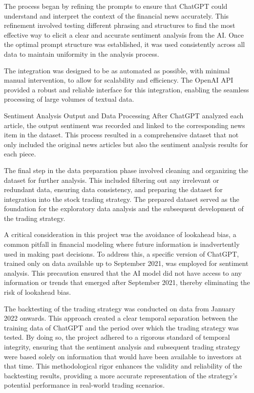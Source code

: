 The process began by refining the prompts to ensure that ChatGPT could understand and interpret the context of the financial news accurately. This refinement involved testing different phrasing and structures to find the most effective way to elicit a clear and accurate sentiment analysis from the AI. Once the optimal prompt structure was established, it was used consistently across all data to maintain uniformity in the analysis process.

The integration was designed to be as automated as possible, with minimal manual intervention, to allow for scalability and efficiency. The OpenAI API provided a robust and reliable interface for this integration, enabling the seamless processing of large volumes of textual data.

Sentiment Analysis Output and Data Processing
After ChatGPT analyzed each article, the output sentiment was recorded and linked to the corresponding news item in the dataset. This process resulted in a comprehensive dataset that not only included the original news articles but also the sentiment analysis results for each piece.

The final step in the data preparation phase involved cleaning and organizing the dataset for further analysis. This included filtering out any irrelevant or redundant data, ensuring data consistency, and preparing the dataset for integration into the stock trading strategy. The prepared dataset served as the foundation for the exploratory data analysis and the subsequent development of the trading strategy.

A critical consideration in this project was the avoidance of lookahead bias, a common pitfall in financial modeling where future information is inadvertently used in making past decisions. To address this, a specific version of ChatGPT, trained only on data available up to September 2021, was employed for sentiment analysis. This precaution ensured that the AI model did not have access to any information or trends that emerged after September 2021, thereby eliminating the risk of lookahead bias.

The backtesting of the trading strategy was conducted on data from January 2022 onwards. This approach created a clear temporal separation between the training data of ChatGPT and the period over which the trading strategy was tested. By doing so, the project adhered to a rigorous standard of temporal integrity, ensuring that the sentiment analysis and subsequent trading strategy were based solely on information that would have been available to investors at that time. This methodological rigor enhances the validity and reliability of the backtesting results, providing a more accurate representation of the strategy's potential performance in real-world trading scenarios.

